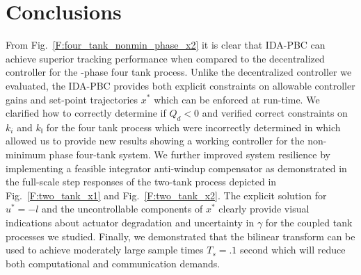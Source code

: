 \section{Conclusions}
\label{S:conclusions}
From Fig.~\ref{F:four_tank_nonmin_phase_x2} it is clear that IDA-PBC
can achieve superior tracking performance when compared to the
decentralized controller for the \nonminimum-phase four tank process.
Unlike the decentralized controller we 
evaluated, the IDA-PBC provides both explicit constraints on allowable
controller gains and set-point trajectories $x^*$ which can be
enforced at run-time.  We clarified how to correctly determine if
$Q_d < 0$ and verified correct constraints on $k_i$ and
$k_{\mathsf{I}}$ for the four tank process which were
incorrectly determined in
\cite{johnsen07:_inter_and_dampin_assig_passiv} which allowed us to
provide new results showing a working controller for the non-minimum phase
four-tank system.  We further improved
system resilience by implementing a 
feasible integrator anti-windup compensator as demonstrated in the
full-scale step responses of the two-tank process depicted in 
Fig.~\ref{F:two_tank_x1} and Fig.~\ref{F:two_tank_x2}.  The explicit 
solution for $u^*=-l$ and the uncontrollable components of $x^*$
clearly provide visual indications about actuator degradation and
uncertainty in $\gamma$ for the coupled tank processes we studied.
Finally, we demonstrated that the bilinear transform can be used to
achieve moderately large sample times $T_s = .1$ second which will
reduce both computational and communication demands.